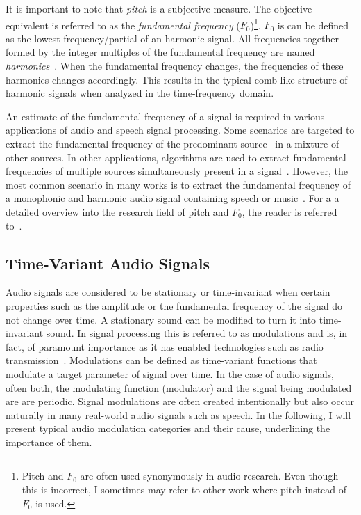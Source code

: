 It is important to note that \emph{pitch} is a subjective measure.
The objective equivalent is referred to as the \emph{fundamental frequency} (\(F_0\))\footnote{Pitch and $F_{0}$ are often used synonymously in audio research. Even though this is incorrect, I sometimes may refer to other work where pitch instead of $F_{0}$ is used.}.
\(F_{0}\) is can be defined as the lowest frequency/partial of an harmonic signal.
All frequencies together formed by the integer multiples of the fundamental frequency are named \textit{harmonics}~\cite{schenker54}.
When the fundamental frequency changes, the frequencies of these harmonics changes accordingly.
This results in the typical comb-like structure of harmonic signals when analyzed in the time-frequency domain.
\par
An estimate of the fundamental frequency of a signal is required in various applications of audio and speech signal processing.
Some scenarios are targeted to extract the fundamental frequency of the predominant source~\cite{salamon12} in a mixture of other sources.
In other applications, algorithms are used to extract fundamental frequencies of multiple sources simultaneously present in a signal~\cite{klapuri03}.
However, the most common scenario in many works is to extract the fundamental frequency of a monophonic and harmonic audio signal containing speech or music~\cite{talkin95, boersma02, decheveigne02, resch07, tidhar10, christensen07}.
For a a detailed overview into the research field of pitch and \(F_{0}\), the reader is referred to~\cite{klapuri06book}.

\subsection{Time-Variant Audio Signals}\label{sub:time-variant-audio-signals}

Audio signals are considered to be stationary or time-invariant when certain properties such as the amplitude or the fundamental frequency of the signal do not change over time.
A stationary sound can be modified to turn it into time-invariant sound. 
In signal processing this is referred to as modulations and is, in fact, of paramount importance as it has enabled technologies such as radio transmission~\cite{shannon48}.
Modulations can be defined as time-variant functions that modulate a target parameter of signal over time.
In the case of audio signals, often both, the modulating function (modulator) and the signal being modulated are are periodic.
Signal modulations are often created intentionally but also occur naturally in many real-world audio signals such as speech.
In the following, I will present typical audio modulation categories and their cause, underlining the importance of them.

